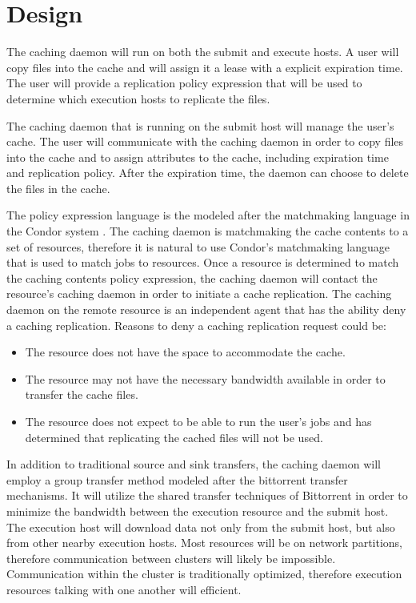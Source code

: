 \section{Design}

The caching daemon will run on both the submit and execute hosts.  A user will copy files into the cache and will assign it a lease with a explicit expiration time.  The user will provide a replication policy expression that will be used to determine which execution hosts to replicate the files.

The caching daemon that is running on the submit host will manage the user's cache.  The user will communicate with the caching daemon in order to copy files into the cache and to assign attributes to the cache, including expiration time and replication policy.  After the expiration time, the daemon can choose to delete the files in the cache.  

The policy expression language is the modeled after the matchmaking language in the Condor system \cite{raman1998matchmaking}.  The caching daemon is matchmaking the cache contents to a set of resources, therefore it is natural to use Condor's matchmaking language that is used to match jobs to resources.  Once a resource is determined to match the caching contents policy expression, the caching daemon will contact the resource's caching daemon in order to initiate a cache replication.  The caching daemon on the remote resource is an independent agent that has the ability deny a caching replication.  Reasons to deny a caching replication request could be:

\begin{itemize}
\item The resource does not have the space to accommodate the cache.
\item The resource may not have the necessary bandwidth available in order to transfer the cache files.
\item The resource does not expect to be able to run the user's jobs and has determined that replicating the cached files will not be used.
\end{itemize}

In addition to traditional source and sink transfers, the caching daemon will employ a group transfer method modeled after the bittorrent \cite{cohen2008bittorrent} transfer mechanisms.  It will utilize the shared transfer techniques of Bittorrent in order to minimize the bandwidth between the execution resource and the submit host.  The execution host will download data not only from the submit host, but also from other nearby execution hosts.  Most resources will be on network partitions, therefore communication between clusters will likely be impossible.  Communication within the cluster is traditionally optimized, therefore execution resources talking with one another will efficient.

